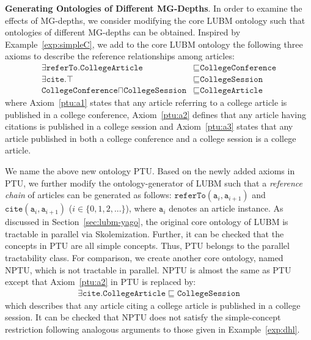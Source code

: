 \textbf{Generating Ontologies of Different MG-Depths}.
In order to examine the effects of MG-depths, we consider modifying the core LUBM ontology
such that ontologies of different MG-depths can be obtained.
Inspired by Example~\ref{exp:simpleC},
we add to the core LUBM ontology the following three axioms to
describe the reference relationships among articles:
\begin{align}
\exists\texttt{referTo}.\texttt{CollegeArticle} & \sqsubseteq\texttt{CollegeConference}\label{ptu:a1}\tag{$\beta_1$}\\
\exists\texttt{cite}.\top & \sqsubseteq\texttt{CollegeSession}\label{ptu:a2}\tag{$\beta_2$}\\
\texttt{CollegeConference}\sqcap\texttt{CollegeSession} & \sqsubseteq\texttt{CollegeArticle}\label{ptu:a3}\tag{$\beta_3$}
\end{align}
where Axiom~\eqref{ptu:a1} states that any article referring to a
college article is published in a college conference,
Axiom~\eqref{ptu:a2} defines that any article having citations is
published in a college session and Axiom~\eqref{ptu:a3} states that
any article published in both a college conference and a college
session is a college article.

We name the above new ontology PTU.
Based on the newly added axioms in PTU, we further modify the ontology-generator
of LUBM such that a \emph{reference chain} of articles can be generated as follows:
$\texttt{referTo}(\texttt{a}_i,\texttt{a}_{i+1})$ and
$\texttt{cite}(\texttt{a}_i,\texttt{a}_{i+1})$ ($i\in\{0,1,2,...\}$),
where $\texttt{a}_i$ denotes an article instance.
As discussed in Section~\ref{sec:lubm-yago},
the original core ontology of LUBM is tractable in parallel via
Skolemization. Further, it can be checked that the concepts in PTU
are all simple concepts. Thus, PTU belongs to the parallel tractability class.
For comparison, we create another core ontology, named NPTU, which
is not tractable in parallel. NPTU is almost the same as PTU except that
Axiom~\eqref{ptu:a2} in PTU is replaced by:
\begin{align}
\exists\texttt{cite}.\texttt{CollegeArticle}\sqsubseteq\texttt{CollegeSession}\label{nptu:a1}\tag{$\beta_4$}
\end{align}
which describes that any article citing a college article is published in a
college session.
It can be checked that NPTU does not satisfy the simple-concept
restriction following analogous arguments to those given in Example~\ref{exp:dhl}.

